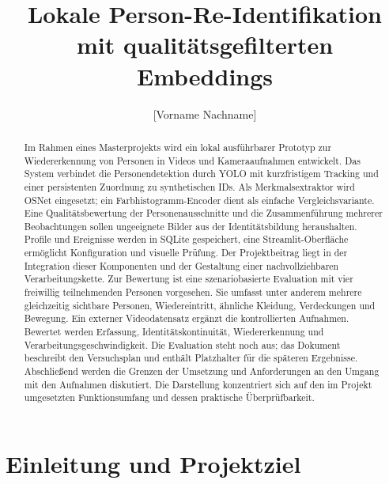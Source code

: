 \documentclass[runningheads]{llncs}
\newcommand{\todoentry}[1]{\textcolor{red!70!black}{[#1]}}
\begin{document}
\title{Lokale Person-Re-Identifikation mit qualitätsgefilterten Embeddings}

\author{\todoentry{Vorname Nachname}}
\authorrunning{\todoentry{Nachname}}
\institute{\todoentry{Hochschule für angewandte Wissenschaften}\\
\todoentry{Fakultät / Masterstudiengang / Modul}\\
\email{\todoentry{hochschul-email@example.org}}}

\maketitle

\begin{abstract}
Im Rahmen eines Masterprojekts wird ein lokal ausführbarer Prototyp zur Wiedererkennung von Personen in Videos und Kameraaufnahmen entwickelt. Das System verbindet die Personendetektion durch YOLO mit kurzfristigem Tracking und einer persistenten Zuordnung zu synthetischen IDs. Als Merkmalsextraktor wird OSNet eingesetzt; ein Farbhistogramm-Encoder dient als einfache Vergleichsvariante. Eine Qualitätsbewertung der Personenausschnitte und die Zusammenführung mehrerer Beobachtungen sollen ungeeignete Bilder aus der Identitätsbildung heraushalten. Profile und Ereignisse werden in SQLite gespeichert, eine Streamlit-Oberfläche ermöglicht Konfiguration und visuelle Prüfung. Der Projektbeitrag liegt in der Integration dieser Komponenten und der Gestaltung einer nachvollziehbaren Verarbeitungskette. Zur Bewertung ist eine szenariobasierte Evaluation mit vier freiwillig teilnehmenden Personen vorgesehen. Sie umfasst unter anderem mehrere gleichzeitig sichtbare Personen, Wiedereintritt, ähnliche Kleidung, Verdeckungen und Bewegung. Ein externer Videodatensatz ergänzt die kontrollierten Aufnahmen. Bewertet werden Erfassung, Identitätskontinuität, Wiedererkennung und Verarbeitungsgeschwindigkeit. Die Evaluation steht noch aus; das Dokument beschreibt den Versuchsplan und enthält Platzhalter für die späteren Ergebnisse. Abschlie{\ss}end werden die Grenzen der Umsetzung und Anforderungen an den Umgang mit den Aufnahmen diskutiert. Die Darstellung konzentriert sich auf den im Projekt umgesetzten Funktionsumfang und dessen praktische Überprüfbarkeit.
\end{abstract}

\section{Einleitung und Projektziel}
\end{document}
